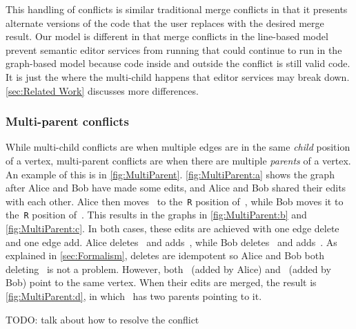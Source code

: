 This handling of conflicts is similar traditional merge conflicts in that
it presents alternate versions of the code that the user replaces with the desired merge result.
Our model is different in that merge conflicts in the line-based model
prevent semantic editor services from running
that could continue to run in the graph-based model because
code inside and outside the conflict is still valid code.
It is just the where the multi-child happens that editor services may break down.
\autoref{sec:Related Work} discusses more differences.

\subsubsection{Multi-parent conflicts}%
\label{sub:Multi-parent conflicts}

\figureMultiParent{}

While multi-child conflicts are when multiple edges are in the same \emph{child} position of a vertex,
multi-parent conflicts are when there are multiple \emph{parents} of a vertex.
An example of this is in \autoref{fig:MultiParent}.
\autoref{fig:MultiParent:a} shows the graph after Alice and Bob have made some edits,
and Alice and Bob shared their edits with each other.
Alice then moves~\vNestedPartsAlice{} to the~\texttt{R} position of~\vSimpleTimes{},
while Bob moves it to the~\texttt{R} position of~\vWrapPlus{}.
This results in the graphs in \autoref{fig:MultiParent:b} and \autoref{fig:MultiParent:c}.
In both cases, these edits are achieved with one edge delete and one edge add.
Alice deletes~\eNestedPartsAlice{} and adds~\eMultiParentAlice{}, while
Bob deletes~\eNestedPartsAlice{} and adds~\eMultiParentBob{}.
As explained in \autoref{sec:Formalism}, deletes are idempotent so Alice and Bob both deleting~\eNestedPartsAlice{} is not a problem.
However, both~\eMultiParentAlice{} (added by Alice) and~\eMultiParentBob{} (added by Bob) point to the same vertex.
When their edits are merged, the result is \autoref{fig:MultiParent:d}, in which~\vNestedPartsAlice{} has two parents pointing to it.

TODO: talk about how to resolve the conflict




